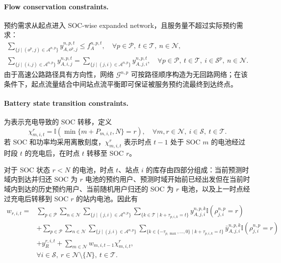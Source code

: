 \documentclass[12pt,hyperref,a4paper,UTF8]{ctexart}
\begin{document}
\paragraph{Flow conservation constraints.}
预约需求从起点进入 SOC-wise expanded network，且服务量不超过实际预约需求：
\begin{subequations}
\label{eq:flow}
\begin{gather}
\sum_{\{j\mid (o^p,j)\in \mathcal{A}^{n,p}\}}{y_{A,o^p,j}^{n,p,t}} \leq f_A^{n,p,t},
\quad \forall p\in \mathcal{P},\ t\in \mathcal{T},\ n \in \mathcal{N},\label{eq:flow1}\\
\sum_{\{j\mid (i,j)\in \mathcal{A}^{n,p}\}}{y_{A,i,j}^{n,p,t}} =
\sum_{\{j\mid (j,i)\in \mathcal{A}^{n,p}\}}{y_{A,j,i}^{n,p,t}},
\quad \forall p\in \mathcal{P},\ t\in \mathcal{T},\ i\in \mathcal{S}^p,
\ n\in\mathcal{N}.
\label{eq:flow2}
\end{gather}
\end{subequations}
由于高速公路路径具有方向性，网络 $\mathcal{G}^{n,p}$ 可按路径顺序构造为无回路网络；在该条件下，起点流量结合中间站点流平衡即可保证被服务预约流最终到达终点。

\paragraph{Battery state transition constraints.}
为表示充电导致的 SOC 转移，定义
\begin{equation}
\chi_{m,i,t}^{r}=\mathbb{I}\!\left(\min\{m+P_{m,i,t},N\}=r\right),
\quad \forall m,r\in\mathcal{N},\ i\in\mathcal{S},\ t\in\mathcal{T}.
\label{eq:charging_indicator}
\end{equation}
若 SOC 和功率均采用离散刻度，$\chi_{m,i,t}^{r}$ 表示时点 $t-1$ 处于 SOC $m$ 的电池经过时段 $t$ 的充电后，在时点 $t$ 转移至 SOC $r$。

对于 SOC 状态 $r<N$ 的电池，时点 $t$、站点 $i$ 的库存由四部分组成：当前预测时域内到达并归还 SOC 为 $r$ 电池的预约用户、预测时域开始前已经出发但在当前时域内到达的历史预约用户、当前随机用户归还的 SOC 为 $r$ 电池，以及上一时点经过充电后转移到 SOC $r$ 的站内电池。因此有
\begin{equation}
\begin{aligned}
w_{r,i,t}
=&
\sum_{p\in \mathcal{P}}
\sum_{n\in \mathcal{N}}
\sum_{\{j\mid (j,i)\in \mathcal{A}^{n,p}\}}
\sum_{\{k\in \mathcal{T}\mid k+\tau_{p,i,k}=t\}}
y_{A,j,i}^{n,p,k}
\mathbb{I}\!\left(\rho_{j,i}^{n,p}=r\right)
\\
&+
\sum_{p\in \mathcal{P}}
\sum_{n\in \mathcal{N}}
\sum_{\{j\mid (j,i)\in \mathcal{A}^{n,p}\}}
\sum_{\{k\in\{-\tau_{p,\max},\ldots,0\}\mid k+\tau_{p,i,k}=t\}}
\bar{y}_{A,j,i}^{n,p,k}
\mathbb{I}\!\left(\rho_{j,i}^{n,p}=r\right)
\\
&+
y_R^{r,i,t}
+
\sum_{m\in \mathcal{N}}
w_{m,i,t-1}\chi_{m,i,t}^{r},
\\
&\forall i\in \mathcal{S},\ r\in \mathcal{N}\setminus\{N\},\ t\in \mathcal{T}.
\end{aligned}
\label{eq:transition_nonfull}
\end{equation}
\end{document}
